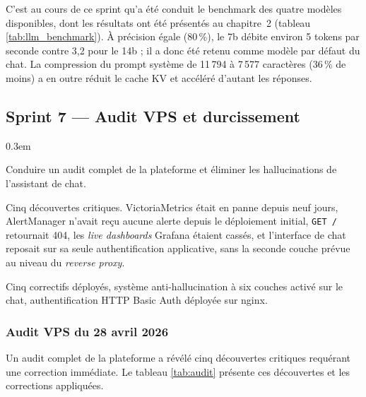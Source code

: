         C'est au cours de ce sprint qu'a été conduit le benchmark des quatre modèles
        disponibles, dont les résultats ont été présentés au chapitre~2 (tableau
        \ref{tab:llm_benchmark}). À précision égale (80\,\%), le 7b débite environ
        5 tokens par seconde contre 3,2 pour le 14b ; il a donc été retenu comme modèle
        par défaut du chat. La compression du prompt système de 11\,794 à 7\,577 caractères
        (36\,\% de moins) a en outre réduit le cache KV et accéléré d'autant les
        réponses.

    \subsection{Sprint 7 — Audit VPS et durcissement}

        \begin{description}
            \itemsep 0.3em
            \item[Objectif du sprint :] Conduire un audit complet de la plateforme
                et éliminer les hallucinations de l'assistant de chat.
            \item[Obstacles rencontrés :] Cinq découvertes critiques. VictoriaMetrics
                était en panne depuis neuf jours, AlertManager n'avait reçu aucune
                alerte depuis le déploiement initial, \texttt{GET /} retournait 404,
                les \textit{live dashboards} Grafana étaient cassés, et l'interface
                de chat reposait sur sa seule authentification applicative, sans la
                seconde couche prévue au niveau du \textit{reverse proxy}.
            \item[Livrable :] Cinq correctifs déployés, système anti-hallucination à
                six couches activé sur le chat, authentification HTTP Basic Auth
                déployée sur nginx.
        \end{description}

        \subsubsection{Audit VPS du 28 avril 2026}

        Un audit complet de la plateforme a révélé cinq découvertes critiques requérant
        une correction immédiate. Le tableau \ref{tab:audit} présente ces découvertes et
        les corrections appliquées.

